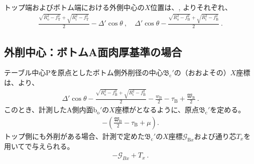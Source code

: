 トップ端およびボトム端における外側中心の$X$位置は、, よりそれぞれ、
\begin{align*}
  \frac{\sqrt{R_\mathrm o^2-f_\mathrm T^2}+\sqrt{R_\mathrm i^2-f_\mathrm T^2}}2-\varDelta'\cos\theta~, \quad
  \varDelta'\cos\theta-\frac{\sqrt{R_\mathrm o^2-f_\mathrm B^2}+\sqrt{R_\mathrm i^2-f_\mathrm B^2}}2\ .
\end{align*}





\subsection{外削中心：ボトムA面肉厚基準の場合}
テーブル中心Pを原点としたボトム側外削径の中心$\mathfrak B_\mathrm c'$の（おおよその）$X$座標は、より、
\begin{align*}
  \varDelta'\cos\theta-\frac{\sqrt{R_\mathrm o^2-f_\mathrm B^2}+\sqrt{R_\mathrm i^2-f_\mathrm B^2}}2
  -\frac{w_\mathrm B}2-\tau_\mathrm B+\frac{\mathfrak W_\mathrm B}2\ .
\end{align*}
このとき、計測したA側内面b$_\mathrm o'$の$X$座標がとなるように、原点$\mathfrak B_\mathrm c'$を定める。
\begin{align*}
  -\left(\frac{\mathfrak W_\mathrm B}2-\tau_\mathrm B+\mu\right).
\end{align*}
トップ側にも外削がある場合、計測で定めた$\mathfrak B_\mathrm c'$の$X$座標$\mathcal G_{\mathrm Bx}$および通り芯$T_x$を用いてで与えられる。
\begin{align*}
  -\mathcal G_{Bx}+T_x\ .
\end{align*}


